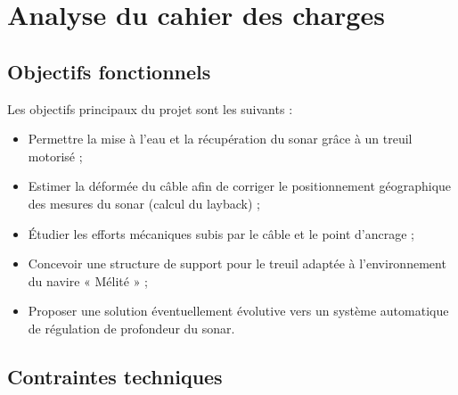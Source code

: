 \documentclass[12pt,a4paper]{article}
\begin{document}






\section{Analyse du cahier des charges}








\subsection{Objectifs fonctionnels}






Les objectifs principaux du projet sont les suivants :


\begin{itemize}


  \item Permettre la mise à l’eau et la récupération du sonar grâce à un treuil motorisé ;


  \item Estimer la déformée du câble afin de corriger le positionnement géographique des mesures du sonar (calcul du layback) ;


  \item Étudier les efforts mécaniques subis par le câble et le point d’ancrage ;


  \item Concevoir une structure de support pour le treuil adaptée à l’environnement du navire « Mélité » ;


  \item Proposer une solution éventuellement évolutive vers un système automatique de régulation de profondeur du sonar.


\end{itemize}






\subsection{Contraintes techniques}
\end{document}
